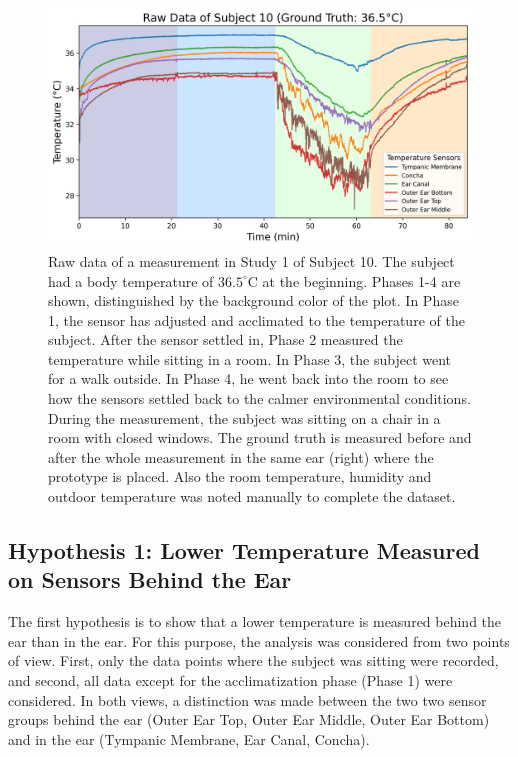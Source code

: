 \begin{figure}[!t]
    \centering
    \includegraphics[width=\textwidth]{thesis-doc/images/study1/Logging_person_10_0smoothed_raw_data.png}
    \caption{Raw data of a measurement in Study 1 of Subject 10. The subject had a body temperature of $36.5^\circ\text{C}$ at the beginning. Phases 1-4 are shown, distinguished by the background color of the plot. In Phase 1, the sensor has adjusted and acclimated to the temperature of the subject. After the sensor settled in, Phase 2 measured the temperature while sitting in a room. In Phase 3, the subject went for a walk outside. In Phase 4, he went back into the room to see how the sensors settled back to the calmer environmental conditions. During the measurement, the subject was sitting on a chair in a room with closed windows. The ground truth is measured before and after the whole measurement in the same ear (right) where the prototype is placed. Also the room temperature, humidity and outdoor temperature was noted manually to complete the dataset.}
    \label{fig:ch:Evaluation:Study1:RawData}
\end{figure}

\subsection{Hypothesis 1: Lower Temperature Measured on Sensors Behind the Ear}
\label{subsec:Evaluation:Study1:Hypothesis1}

The first hypothesis is to show that a lower temperature is measured behind the ear than in the ear.
For this purpose, the analysis was considered from two points of view. 
First, only the data points where the subject was sitting were recorded, and second, all data except for the acclimatization phase (Phase 1) were considered.
In both views, a distinction was made between the two two sensor groups behind the ear (Outer Ear Top, Outer Ear Middle, Outer Ear Bottom) and in the ear (Tympanic Membrane, Ear Canal, Concha). 

